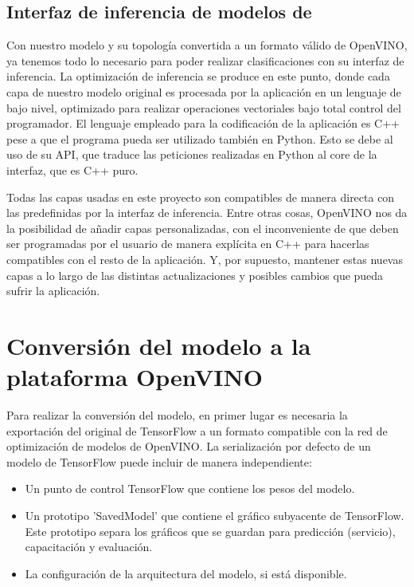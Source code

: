 \subsection{Interfaz de inferencia de modelos de }
\label{subsec:interfaz-de-infernecia-de-modelos-de-deep-learning}
Con nuestro modelo y su topología convertida a un formato válido de OpenVINO, ya tenemos todo lo necesario para poder realizar clasificaciones con su interfaz de inferencia\@.
La optimización de inferencia se produce en este punto, donde cada capa de nuestro modelo original es procesada por la aplicación en un lenguaje de bajo nivel, optimizado para realizar operaciones vectoriales bajo total control del programador.
El lenguaje empleado para la codificación de la aplicación es C++ pese a que el programa pueda ser utilizado también en Python.
Esto se debe al uso de su API, que traduce las peticiones realizadas en Python al core de la interfaz, que es C++ puro.

Todas las capas usadas en este proyecto son compatibles de manera directa con las predefinidas por la interfaz de inferencia.
Entre otras cosas, OpenVINO nos da la posibilidad de añadir capas personalizadas, con el inconveniente de que deben ser programadas por el usuario de manera explícita en C++ para hacerlas compatibles con el resto de la aplicación.
Y, por supuesto, mantener estas nuevas capas a lo largo de las distintas actualizaciones y posibles cambios que pueda sufrir la aplicación.


\section{Conversión del modelo a la plataforma OpenVINO}\label{sec:conversión-del-modelo-a-la-plataforma-OpenVINO}
Para realizar la conversión del modelo, en primer lugar es necesaria la exportación del original de TensorFlow a un formato compatible con la red de optimización de modelos de OpenVINO\@.
La serialización por defecto de un modelo de TensorFlow puede incluir de manera independiente:

\begin{itemize}
    \item Un punto de control TensorFlow que contiene los pesos del modelo.
    \item Un prototipo 'SavedModel' que contiene el gráfico subyacente de TensorFlow.
    Este prototipo separa los gráficos que se guardan para predicción (servicio), capacitación y evaluación.
    \item La configuración de la arquitectura del modelo, si está disponible.
\end{itemize}

